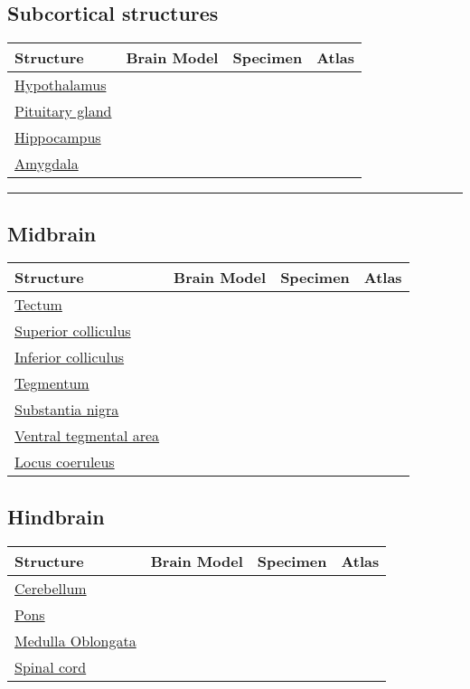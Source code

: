 \documentclass[]{article}
\begin{document}
\hypertarget{subcortical-structures-1}{%
\subsection{Subcortical structures}\label{subcortical-structures-1}}

\begin{longtable}[]{@{}llll@{}}
\toprule
Structure & Brain Model & Specimen & Atlas\tabularnewline
\midrule
\endhead
\href{https://en.wikipedia.org/wiki/Hypothalamus}{Hypothalamus} & &
&\tabularnewline
\href{https://en.wikipedia.org/wiki/Pituitary_gland}{Pituitary gland} &
& &\tabularnewline
\href{https://en.wikipedia.org/wiki/Hippocampus}{Hippocampus} & &
&\tabularnewline
\href{https://en.wikipedia.org/wiki/Amygdala}{Amygdala} & &
&\tabularnewline
\bottomrule
\end{longtable}

\begin{center}\rule{0.5\linewidth}{\linethickness}\end{center}

\hypertarget{midbrain}{%
\subsection{Midbrain}\label{midbrain}}

\begin{longtable}[]{@{}llll@{}}
\toprule
Structure & Brain Model & Specimen & Atlas\tabularnewline
\midrule
\endhead
\href{https://en.wikipedia.org/wiki/Midbrain_tectum}{Tectum} & &
&\tabularnewline
\href{https://en.wikipedia.org/wiki/Superior_colliculus}{Superior
colliculus} & & &\tabularnewline
\href{https://en.wikipedia.org/wiki/Inferior_colliculus}{Inferior
colliculus} & & &\tabularnewline
\href{https://en.wikipedia.org/wiki/Tegmentum}{Tegmentum} & &
&\tabularnewline
\href{https://en.wikipedia.org/wiki/Substantia_nigra}{Substantia nigra}
& & &\tabularnewline
\href{https://en.wikipedia.org/wiki/Ventral_tegmental_area}{Ventral
tegmental area} & & &\tabularnewline
\href{https://en.wikipedia.org/wiki/Locus_coeruleus}{Locus coeruleus} &
& &\tabularnewline
\bottomrule
\end{longtable}

\hypertarget{hindbrain}{%
\subsection{Hindbrain}\label{hindbrain}}

\begin{longtable}[]{@{}llll@{}}
\toprule
Structure & Brain Model & Specimen & Atlas\tabularnewline
\midrule
\endhead
\href{https://en.wikipedia.org/wiki/Cerebellum}{Cerebellum} & &
&\tabularnewline
\href{https://en.wikipedia.org/wiki/Pons}{Pons} & & &\tabularnewline
\href{https://en.wikipedia.org/wiki/Medulla_oblongata}{Medulla
Oblongata} & & &\tabularnewline
\href{https://en.wikipedia.org/wiki/Spinal_cord}{Spinal cord} & &
&\tabularnewline
\bottomrule
\end{longtable}
\end{document}
